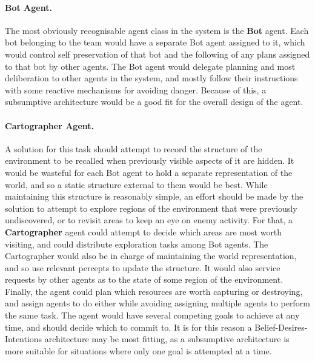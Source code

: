 \documentclass[a4paper,10pt]{article}
\begin{document}
\paragraph{Bot Agent.}
The most obviously recognisable agent class in the system is the \textbf{Bot} agent. Each bot belonging to the team would have a separate Bot agent assigned to it, which would control self preservation of that bot and the following of any plans assigned to that bot by other agents. The Bot agent would delegate planning and most deliberation to other agents in the system, and mostly follow their instructions with some reactive mechanisms for avoiding danger. Because of this, a subsumptive architecture\cite{brooks90} would be a good fit for the overall design of the agent.

\paragraph{Cartographer Agent.}
A solution for this task should attempt to record the structure of the environment to be recalled when previously visible aspects of it are hidden. It would be wasteful for each Bot agent to hold a separate representation of the world, and so a static structure external to them would be best. While maintaining this structure is reasonably simple, an effort should be made by the solution to attempt to explore regions of the environment that were previously undiscovered, or to revisit areas to keep an eye on enemy activity. For that, a \textbf{Cartographer} agent could attempt to decide which areas are most worth visiting, and could distribute exploration tasks among Bot agents. The Cartographer would also be in charge of maintaining the world representation, and so use relevant percepts to update the structure. It would also service requests by other agents as to the state of some region of the environment. Finally, the agent could plan which resources are worth capturing or destroying, and assign agents to do either while avoiding assigning multiple agents to perform the same task. The agent would have several competing goals to achieve at any time, and should decide which to commit to. It is for this reason a Belief-Desires-Intentions\cite{rao95} architecture may be most fitting, as a subsumptive architecture is more suitable for situations where only one goal is attempted at a time.
\end{document}
